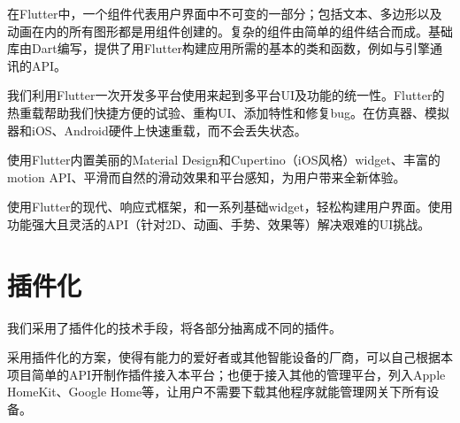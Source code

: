 在Flutter中，一个组件代表用户界面中不可变的一部分；包括文本、多边形以及动画在内的所有图形都是用组件创建的。复杂的组件由简单的组件结合而成。基础库由Dart编写，提供了用Flutter构建应用所需的基本的类和函数，例如与引擎通讯的API。\cite{flutter}

我们利用Flutter一次开发多平台使用来起到多平台UI及功能的统一性。Flutter的热重载帮助我们快捷方便的试验、重构UI、添加特性和修复bug。在仿真器、模拟器和iOS、Android硬件上快速重载，而不会丢失状态。

使用Flutter内置美丽的Material Design和Cupertino（iOS风格）widget、丰富的motion API、平滑而自然的滑动效果和平台感知，为用户带来全新体验。

使用Flutter的现代、响应式框架，和一系列基础widget，轻松构建用户界面。使用功能强大且灵活的API（针对2D、动画、手势、效果等）解决艰难的UI挑战。\cite{quickdev}

\section{插件化}
我们采用了插件化的技术手段，将各部分抽离成不同的插件。

采用插件化的方案，使得有能力的爱好者或其他智能设备的厂商，可以自己根据本项目简单的API开制作插件接入本平台；也便于接入其他的管理平台，列入Apple HomeKit、Google Home等，让用户不需要下载其他程序就能管理网关下所有设备。